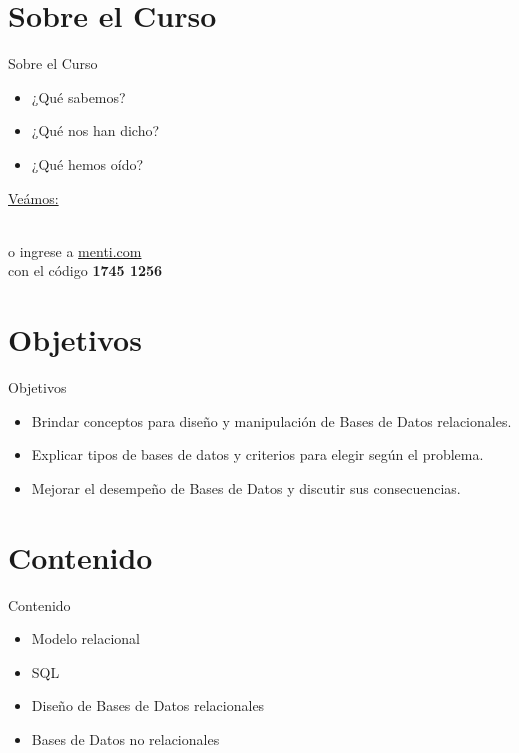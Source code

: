 \documentclass{beamer}
\begin{document}
\section{Sobre el Curso}

\begin{frame}{Sobre el Curso}
\begin{itemize}
    \item ¿Qué sabemos?
    \item ¿Qué nos han dicho?
    \item ¿Qué hemos oído?
\end{itemize}

    \centering
    \vspace{10mm}
    {\small \href{https://www.mentimeter.com/app/presentation/al6waq1imqe1wo44sd3649umpty791yr/edit?question=8u2renziehhs}{Veámos:}}\\
    \vspace{2mm}
  
    \\
    \vspace{2mm}
    \footnotesize  o ingrese a \href{https://www.menti.com/}{menti.com}\\ con el código \textbf{1745 1256}
\end{frame}

\section{Objetivos}

\begin{frame}{Objetivos}
\begin{itemize}
    \item Brindar conceptos para diseño y manipulación de Bases de Datos relacionales.
    \item Explicar tipos de bases de datos y criterios para elegir según el problema.
    \item Mejorar el desempeño de Bases de Datos y discutir sus consecuencias.
\end{itemize}
\end{frame}

\section{Contenido}

\begin{frame}{Contenido}
\begin{itemize}
    \item Modelo relacional
    \item SQL
    \item Diseño de Bases de Datos relacionales
    \item Bases de Datos no relacionales
\end{itemize}
\end{frame}
\end{document}
